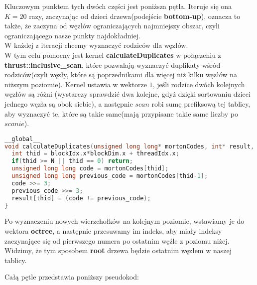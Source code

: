 \documentclass[14pt,twoside,a4paper]{article}
\theoremstyle{definition}
\begin{document}
Kluczowym punktem tych dwóch części jest poniższa pętla. Iteruje się ona $K=20$ razy, zaczynając od dzieci drzewa(podejście \textbf{bottom-up}), oznacza to także, że zaczyna od węzłów ograniczających najmniejszy obszar, czyli ograniczającego nasze punkty najdokładniej.\\
W każdej z iteracji chcemy wyznaczyć rodziców dla węzłów. \\W tym celu pomocny jest kernel \textbf{calculateDuplicates} w połączeniu z \textbf{thrust::inclusive\_scan}, które pozwalają wyznaczyć duplikaty wśród rodziców(czyli węzły, które są poprzednikami dla więcej niż kilku węzłów na niższym poziomie). 
Kernel ustawia w wektorze $1$, jeśli rodzice dwóch kolejnych węzłów są różni (wystarczy sprawdzić dwa kolejne, gdyż dzięki sortowaniu dzieci jednego węzła są obok siebie), a następnie $scan$ robi sumę prefiksową tej tablicy, aby wyznaczyć te, które są takie same(mają przypisane takie same liczby po $scanie$).

\begin{lstlisting}[language=C++, frame=single, framerule=2pt, caption=Kernel calculateDuplicates]
__global__
void calculateDuplicates(unsigned long long* mortonCodes, int* result, int N) {
  int thid = blockIdx.x*blockDim.x + threadIdx.x;
  if(thid >= N || thid == 0) return;
  unsigned long long code = mortonCodes[thid];
  unsigned long long previous_code = mortonCodes[thid-1];
  code >>= 3;
  previous_code >>= 3;
  result[thid] = (code != previous_code);
}

\end{lstlisting}

Po wyznaczeniu nowych wierzchołków na kolejnym poziomie, wstawiamy je do wektora \textbf{octree}, a następnie przesuwamy im indeks, aby miały indeksy zaczynające się od pierwszego numera po ostatnim węźle z poziomu niżej. Widzimy, że tym sposobem \textbf{root} drzewa będzie ostatnim węzłem w naszej tablicy.


Całą pętle przedstawia poniższy pseudokod:
\end{document}
